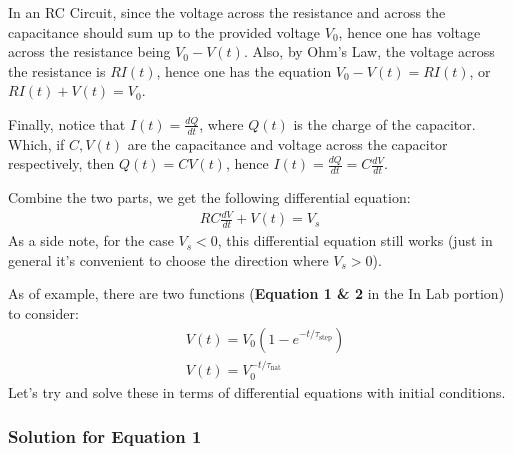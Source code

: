 \documentclass{article}
\begin{document}
In an RC Circuit, since the voltage across the resistance and across the capacitance should sum up to the provided voltage $V_0$, hence one has voltage across the resistance being $V_0-V(t)$. Also, by Ohm's Law, the voltage across the resistance is $R I(t)$, hence one has the equation $V_0-V(t)=R I(t)$, or $R I(t)+V(t)=V_0$.

Finally, notice that $I(t)=\frac{dQ}{dt}$, where $Q(t)$ is the charge of the capacitor. Which, if $C,V(t)$ are the capacitance and voltage across the capacitor respectively, then $Q(t)=C V(t)$, hence $I(t)=\frac{dQ}{dt} = C \frac{dV}{dt}$.

Combine the two parts, we get the following differential equation:
\begin{align}
    RC\frac{dV}{dt}+V(t)=V_s
\end{align}
As a side note, for the case $V_s<0$, this differential equation still works (just in general it's convenient to choose the direction where $V_s>0$).

\hfil

As of example, there are two functions (\textbf{Equation 1 \& 2} in the In Lab portion) to consider:
\begin{align}
    &V(t)=V_0 (1-e^{-t/\tau_\text{step}})\\
    &V(t)=V_0^{-t/\tau_\text{nat}}
\end{align}
Let's try and solve these in terms of differential equations with initial conditions.

\newpage

\subsubsection{Solution for Equation 1}
\end{document}

